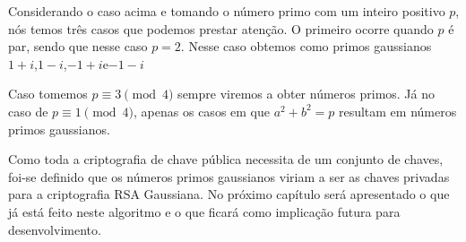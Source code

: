 Considerando o caso acima e tomando o n\'umero primo com um inteiro positivo $p$, n\'os temos tr\^es casos que podemos prestar aten\c{c}\~ao. O primeiro ocorre quando $p$ \'e par, sendo que nesse caso $p=2$. Nesse caso obtemos como primos gaussianos $1+i$,$ 1-i$,$ -1+i $e$ -1-i $

Caso tomemos $p \equiv 3 \pmod{4}$ sempre viremos a obter n\'umeros primos. J\'a no caso de $p \equiv 1\pmod{4}$, apenas os casos em que $a^2+b^2=p$ resultam em n\'umeros primos gaussianos.

Como toda a criptografia de chave p\'ublica necessita de um conjunto de chaves, foi-se definido que os n\'umeros primos gaussianos viriam a ser as chaves privadas para a criptografia RSA Gaussiana. No pr\'oximo cap\'itulo ser\'a apresentado o que j\'a est\'a feito neste algoritmo e o que ficar\'a como implica\c{c}\~ao futura para desenvolvimento.
